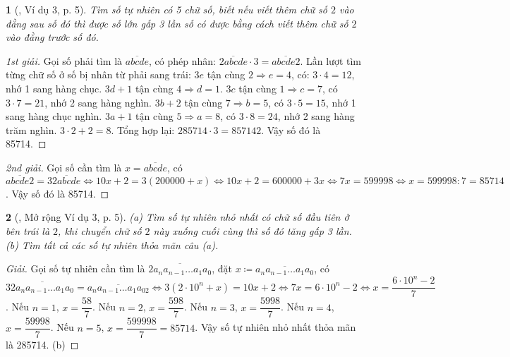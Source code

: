 \documentclass{article}
\newtheorem{baitoan}{}
\begin{document}
\begin{baitoan}[\cite{Binh_Toan_6_tap_1}, Ví dụ 3, p. 5]
	Tìm số tự nhiên có 5 chữ số, biết nếu viết thêm chữ số $2$ vào đằng sau số đó thì được số lớn gấp 3 lần số có được bằng cách viết thêm chữ số $2$ vào đằng trước số đó.
\end{baitoan}

\begin{proof}[1st giải]
	Gọi số phải tìm là $\overline{abcde}$, có phép nhân: $\overline{2abcde}\cdot3 = \overline{abcde2}$. Lần lượt tìm từng chữ số ở số bị nhân từ phải sang trái: $3e$ tận cùng $2\Rightarrow e = 4$, có: $3\cdot4 = 12$, nhớ 1 sang hàng chục. $3d + 1$ tận cùng $4\Rightarrow d = 1$. $3c$ tận cùng $1\Rightarrow c = 7$, có $3\cdot7 = 21$, nhớ 2 sang hàng nghìn. $3b + 2$ tận cùng $7\Rightarrow b = 5$, có $3\cdot5 = 15$, nhớ 1 sang hàng chục nghìn. $3a + 1$ tận cùng $5\Rightarrow a = 8$, có $3\cdot8 = 24$, nhớ 2 sang hàng trăm nghìn. $3\cdot2 + 2 = 8$. Tổng hợp lại: $285714\cdot3 = 857142$. Vậy số đó là 85714.
\end{proof}

\begin{proof}[2nd giải]
	Gọi số cần tìm là $x = \overline{abcde}$, có $\overline{abcde2} = 3\overline{2abcde}\Leftrightarrow10x + 2 = 3(200000 + x)\Leftrightarrow10x + 2 = 600000 + 3x\Leftrightarrow7x = 599998\Leftrightarrow x = 599998:7 = 85714$. Vậy số đó là 85714.
\end{proof}

\begin{baitoan}[\cite{Binh_Toan_6_tap_1}, Mở rộng Ví dụ 3, p. 5]
	(a) Tìm số tự nhiên nhỏ nhất có chữ số đầu tiên ở bên trái là $2$, khi chuyển chữ số $2$ này xuống cuối cùng thì số đó tăng gấp 3 lần. (b) Tìm tất cả các số tự nhiên thỏa mãn câu (a).
\end{baitoan}

\begin{proof}[Giải]
	Gọi số tự nhiên cần tìm là $\overline{2a_na_{n-1}\ldots a_1a_0}$, đặt $x\coloneqq\overline{a_na_{n-1}\ldots a_1a_0}$, có $3\overline{2a_na_{n-1}\ldots a_1a_0} = \overline{a_na_{n-1}\ldots a_1a_02}\Leftrightarrow3(2\cdot10^n + x) = 10x + 2\Leftrightarrow7x = 6\cdot10^n - 2\Leftrightarrow x = \dfrac{6\cdot10^n - 2}{7}$. Nếu $n = 1$, $x = \dfrac{58}{7}$. Nếu $n = 2$, $x = \dfrac{598}{7}$. Nếu $n = 3$, $x = \dfrac{5998}{7}$. Nếu $n = 4$, $x = \dfrac{59998}{7}$. Nếu $n = 5$, $x = \dfrac{599998}{7} = 85714$. Vậy số tự nhiên nhỏ nhất thỏa mãn là 285714. (b) 
\end{proof}
\end{document}
